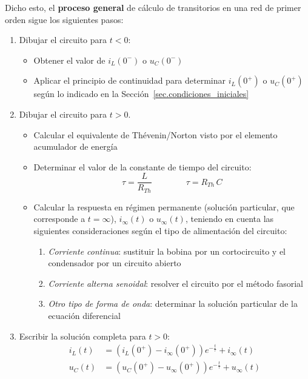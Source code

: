 \documentclass[11pt]{book} %
\numberwithin{dummy}{section}
\theoremstyle{ocrenumbox}
\theoremstyle{blacknumex}
\theoremstyle{blacknumbox}
\theoremstyle{ocrenum}
\newlength\esp
\begin{document}
	Dicho esto, el \textbf{proceso general} de cálculo de transitorios en una red de primer orden sigue los siguientes pasos:
	\begin{enumerate}
	\item Dibujar el circuito para $t < 0$:
        \begin{itemize}
        \item Obtener el valor de $i_L(0^-)$ o $u_C(0^-)$
        \item Aplicar el principio de continuidad para determinar $i_L(0^+)$ o $u_C(0^+)$ según lo indicado en la Sección~\ref{sec.condiciones_iniciales}
        \end{itemize}
    \item Dibujar el circuito para \(t > 0\).
        \begin{itemize}
        \item Calcular el equivalente de Thévenin/Norton visto por el elemento acumulador de energía
        \item Determinar el valor de la constante de tiempo del circuito:
        \begin{equation*}
            \tau = \dfrac{L}{R_{Th}} \qquad\qquad \tau = R_{Th}\,{C}
        \end{equation*}
        \item Calcular la respuesta en régimen permanente (solución particular, que corresponde a $t=\infty$), $i_\infty(t)$ o $u_\infty(t)$, teniendo en cuenta las siguientes consideraciones según el tipo de alimentación del circuito:
        \begin{enumerate}
	        \item \textit{Corriente continua}: sustituir la bobina por un cortocircuito y el condensador por un circuito abierto
	        \item \textit{Corriente alterna senoidal}: resolver el circuito por el método fasorial
	        \item \textit{Otro tipo de forma de onda}: determinar la solución particular de la ecuación diferencial
	    \end{enumerate}
        \end{itemize}
    \item Escribir la solución completa para $t>0$:
    \begin{align*}
    i_L(t) &= \left(i_L(0^+) - i_\infty(0^+)\right) e^{-\frac{t}{\tau}} + i_\infty(t)\\
    u_C(t) &= \left(u_C(0^+) - u_\infty(0^+)\right) e^{-\frac{t}{\tau}} + u_\infty(t)\\
    \end{align*}
	\end{enumerate}
	
\end{document}
